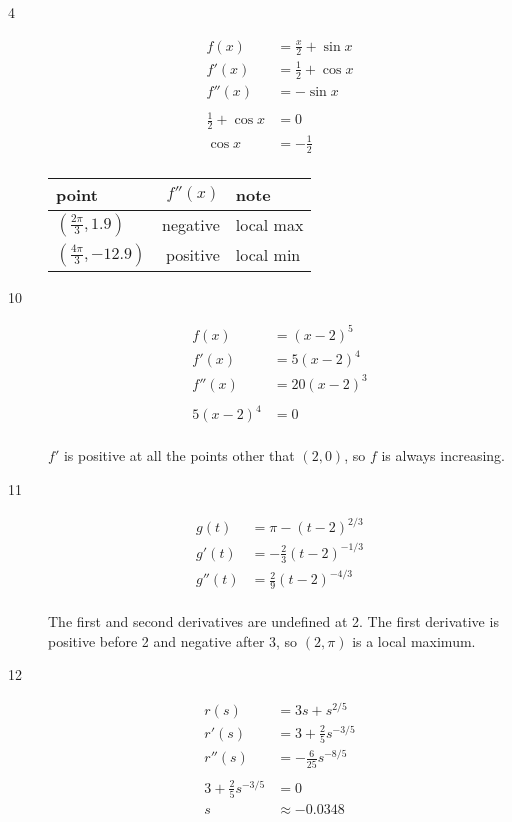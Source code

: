 \documentclass[fleqn]{exam}
\begin{document}
\begin{description}
\item[4]
\begin{align*}
  f(x)   &= \frac{x}{2} + \sin x \\
  f'(x)  & = \frac{1}{2} + \cos x \\  
  f''(x) & = - \sin x \\
\\
  \frac{1}{2} + \cos x &= 0 \\
  \cos x &= - \frac{1}{2} \\
\end{align*}

\begin{tabular}{lrl}
\toprule
point      & $f''(x)$ & note \\
\midrule
$\left(\frac{2 \pi}{3}, 1.9 \right)$  & negative & local max \\
$\left(\frac{4 \pi}{3}, -12.9 \right)$      & positive & local min \\
\bottomrule
\end{tabular}

\pagebreak

\item[10]
\begin{align*}
  f(x)   &= (x - 2)^5 \\
  f'(x)  & = 5(x - 2)^4 \\
  f''(x) & = 20(x - 2)^3 \\
\\
  5(x - 2)^4 &= 0 \\
\end{align*}

$f'$ is positive at all the points other that $(2, 0)$, so $f$ is always increasing.

\item[11]
\begin{align*}
  g(t)   &= \pi - (t - 2)^{2/3} \\
  g'(t)  &= - \frac{2}{3} (t - 2)^{-1/3} \\ %
  g''(t) &= \frac{2}{9} (t - 2)^{-4/3} \\ %
\end{align*}

The first and second derivatives are undefined at 2.  The first derivative is positive before 2 and negative after 3, so
$(2, \pi)$ is a local maximum.

\pagebreak

\item[12]
\begin{align*}
  r(s)   &= 3s + s^{2/5} \\
  r'(s)  &= 3 + \frac{2}{5}s^{-3/5} \\
  r''(s)  &= - \frac{6}{25}s^{-8/5} \\
\\
  3 + \frac{2}{5}s^{-3/5} &= 0 \\
  s &\approx -0.0348
\end{align*}


\end{description}
\end{document}
